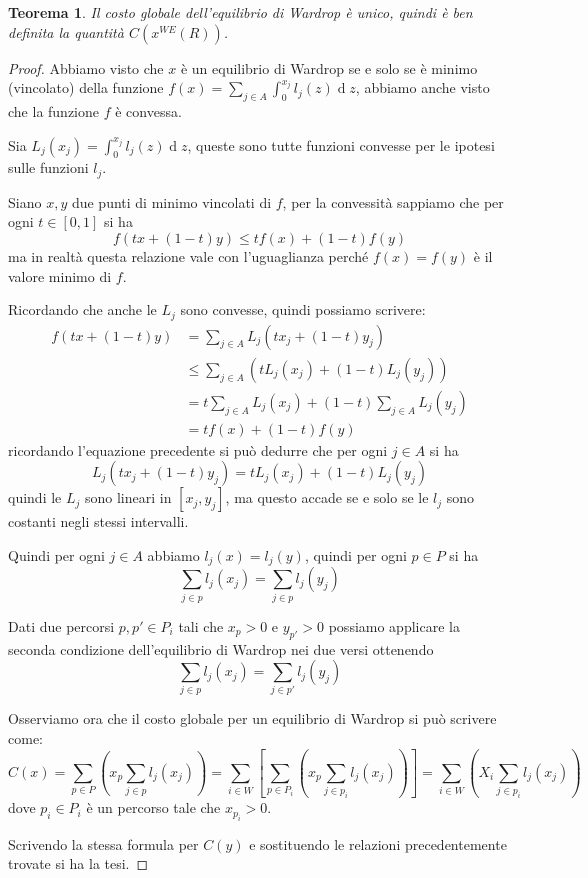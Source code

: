 \documentclass[a4paper]{article}
\theoremstyle{plain}
\newtheorem{myteo}{Teorema}[section]
\theoremstyle{definition}
\theoremstyle{remark}
\newcommand{\pa}[1]{\left(#1\right)}
\newcommand{\bra}[1]{\left[#1\right]}
\DeclareMathOperator{\de}{d}
\begin{document}
\begin{myteo}
  Il costo globale dell'equilibrio di Wardrop è unico, quindi è ben
  definita la quantità $C\pa{x^{WE}\pa{R}}$.
\end{myteo}
\begin{proof}
  Abbiamo visto che $x$ è un equilibrio di Wardrop se e solo se è
  minimo (vincolato) della funzione $f(x) = \sum _{j\in A} \int _0
  ^{x_j} l_j(z)\de z$, abbiamo anche visto che la funzione $f$ è
  convessa.

  Sia $L_j(x_j) = \int _0 ^{x_j} l_j(z)\de z$, queste sono tutte
  funzioni convesse per le ipotesi sulle funzioni $l_j$.

  Siano $x,y$ due punti di minimo vincolati di $f$, per la convessità
  sappiamo che per ogni $t\in\bra{0,1}$ si ha
  \[ f\pa{ tx + (1-t)y} \le tf(x) + (1-t)f(y) \]
  ma in realtà questa relazione vale con l'uguaglianza perché
  $f(x)=f(y)$ è il valore minimo di $f$.

  Ricordando che anche le $L_j$ sono convesse, quindi possiamo
  scrivere:
  \begin{align*}
    f\pa{ tx + (1-t)y} & = \sum _{j\in A} L_j\pa{tx_j + (1-t)y_j} \\
    & \le \sum _{j\in A} \pa{ tL_j(x_j) + (1-t)L_j(y_j)} \\
    & = t \sum _{j\in A} L_j(x_j) + (1-t)\sum _{j\in A} L_j(y_j) \\
    & = tf(x) + (1-t)f(y)
  \end{align*}
  ricordando l'equazione precedente si può dedurre che per ogni $j\in
  A$ si ha
  \[ L_j\pa{tx_j + (1-t)y_j} = tL_j(x_j) + (1-t)L_j(y_j) \]
  quindi le $L_j$ sono lineari in $\bra{x_j,y_j}$, ma questo accade se
  e solo se le $l_j$ sono costanti negli stessi intervalli.

  Quindi per ogni $j\in A$ abbiamo $l_j(x) = l_j(y)$, quindi per ogni
  $p\in P$ si ha
  \[ \sum _{j\in p} l_j\pa{x_j} = \sum _{j\in p} l_j\pa{y_j} \]
  
  Dati due percorsi $p,p'\in P_i$ tali che $x_p>0$ e $y_{p'}>0$ possiamo
  applicare la seconda condizione dell'equilibrio di Wardrop nei due
  versi ottenendo
  \[ \sum _{j\in p} l_j\pa{x_j} = \sum _{j\in p'} l_j\pa{y_j} \]
  
  Osserviamo ora che il costo globale per un equilibrio di Wardrop si
  può scrivere come:
  \[ C\pa{x} = \sum _{p\in P} \pa{ x_p \sum _{j\in p} l_j\pa{x_j}} =
    \sum _{i\in W} \bra{ \sum _{p\in P_i} \pa{ x_p \sum _{j\in p_i}
        l_j\pa{x_j}} } = \sum _{i\in W} \pa{ X_i \sum _{j\in p_i}
      l_j\pa{x_j}} \]
  dove $p_i\in P_i$ è un percorso tale che $x_{p_i} > 0$.

  Scrivendo la stessa formula per $C\pa{y}$ e sostituendo le relazioni
  precedentemente trovate si ha la tesi.
\end{proof}
\end{document}
